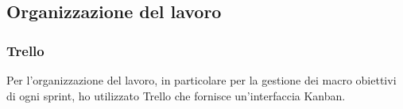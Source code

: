 \subsection{Organizzazione del lavoro}
\subsubsection*{Trello}
Per l'organizzazione del lavoro, in particolare per la gestione dei macro obiettivi di ogni sprint, ho utilizzato Trello che fornisce un'interfaccia Kanban.








